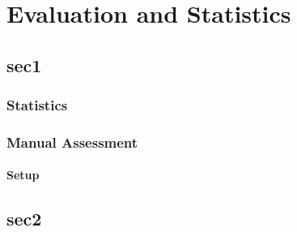 \chapter{Evaluation and Statistics}


\section{sec1}
\subsection{Statistics}


\subsection{Manual Assessment}
\subsubsection{Setup}


\section{sec2}


